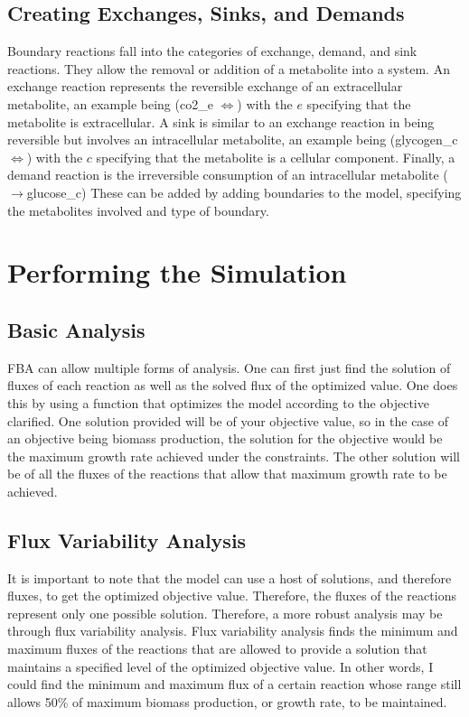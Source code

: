 \subsection{Creating Exchanges, Sinks, and Demands}
Boundary reactions fall into the categories of exchange, demand, and sink reactions. They allow the removal or addition of a metabolite into a system. An exchange reaction represents the reversible exchange of an extracellular metabolite, an example being (co2\_e $\Leftrightarrow $) with the $e$ specifying that the metabolite is extracellular. A sink is similar to an exchange reaction in being reversible but involves an intracellular metabolite, an example being (glycogen\_c $\Leftrightarrow $) with the $c$ specifying that the metabolite is a cellular component. Finally, a demand reaction is the irreversible consumption of an intracellular metabolite ($\rightarrow$glucose\_c) These can be added by adding boundaries to the model, specifying the metabolites involved and type of boundary.

\section{Performing the Simulation}
\subsection{Basic Analysis}
FBA can allow multiple forms of analysis. One can first just find the solution of fluxes of each reaction as well as the solved flux of the optimized value. One does this by using a function that optimizes the model according to the objective clarified. One solution provided will be of your objective value, so in the case of an objective being biomass production, the solution for the objective would be the maximum growth rate achieved under the constraints. The other solution will be of all the fluxes of the reactions that allow that maximum growth rate to be achieved. 

\subsection{Flux Variability Analysis}
It is important to note that the model can use a host of solutions, and therefore fluxes, to get the optimized objective value. Therefore, the fluxes of the reactions represent only one possible solution. Therefore, a more robust analysis may be through flux variability analysis. Flux variability analysis finds the minimum and maximum fluxes of the reactions that are allowed to provide a solution that maintains a specified level of the optimized objective value. In other words, I could find the minimum and maximum flux of a certain reaction whose range still allows 50\% of maximum biomass production, or growth rate, to be maintained. 

